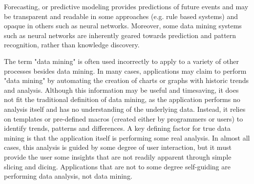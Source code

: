 Forecasting, or predictive modeling provides predictions of future events and may be transparent and readable in some approaches (e.g. rule based systems) and opaque in others such as neural networks. Moreover, some data mining systems such as neural networks are inherently geared towards prediction and pattern recognition, rather than knowledge discovery.



The term "data mining" is often used incorrectly to apply to a variety of other processes besides data mining. In many cases, applications may claim to perform "data mining" by automating the creation of charts or graphs with historic trends and analysis. Although this information may be useful and timesaving, it does not fit the traditional definition of data mining, as the application performs no analysis itself and has no understanding of the underlying data. Instead, it relies on templates or pre-defined macros (created either by programmers or users) to identify trends, patterns and differences. A key defining factor for true data mining is that the application itself is performing some real analysis. In almost all cases, this analysis is guided by some degree of user interaction, but it must provide the user some insights that are not readily apparent through simple slicing and dicing. Applications that are not to some degree self-guiding are performing data analysis, not data mining.


